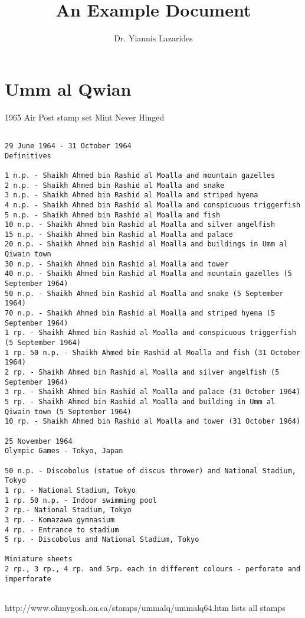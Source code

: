 \documentclass{book}      %
\title{An Example Document}  %
\author{Dr. Yiannis Lazarides}      %
\newcommand{\ph}[3][1]{%
 \begin{figure}[htbp]
   \texttt{[image: \#2]}
   \caption{#3}
 \end{figure}}
\begin{document}

\maketitle                   %




\section{Umm al Qwian}  


 
1965 Air Post stamp set Mint Never Hinged

\begin{verbatim}

29 June 1964 - 31 October 1964
Definitives

1 n.p. - Shaikh Ahmed bin Rashid al Moalla and mountain gazelles
2 n.p. - Shaikh Ahmed bin Rashid al Moalla and snake
3 n.p. - Shaikh Ahmed bin Rashid al Moalla and striped hyena
4 n.p. - Shaikh Ahmed bin Rashid al Moalla and conspicuous triggerfish
5 n.p. - Shaikh Ahmed bin Rashid al Moalla and fish
10 n.p. - Shaikh Ahmed bin Rashid al Moalla and silver angelfish
15 n.p. - Shaikh Ahmed bin Rashid al Moalla and palace
20 n.p. - Shaikh Ahmed bin Rashid al Moalla and buildings in Umm al Qiwain town
30 n.p. - Shaikh Ahmed bin Rashid al Moalla and tower
40 n.p. - Shaikh Ahmed bin Rashid al Moalla and mountain gazelles (5 September 1964)
50 n.p. - Shaikh Ahmed bin Rashid al Moalla and snake (5 September 1964)
70 n.p. - Shaikh Ahmed bin Rashid al Moalla and striped hyena (5 September 1964)
1 rp. - Shaikh Ahmed bin Rashid al Moalla and conspicuous triggerfish (5 September 1964)
1 rp. 50 n.p. - Shaikh Ahmed bin Rashid al Moalla and fish (31 October 1964)
2 rp. - Shaikh Ahmed bin Rashid al Moalla and silver angelfish (5 September 1964)
3 rp. - Shaikh Ahmed bin Rashid al Moalla and palace (31 October 1964)
5 rp. - Shaikh Ahmed bin Rashid al Moalla and building in Umm al Qiwain town (5 September 1964)
10 rp. - Shaikh Ahmed bin Rashid al Moalla and tower (31 October 1964)

25 November 1964
Olympic Games - Tokyo, Japan

50 n.p. - Discobolus (statue of discus thrower) and National Stadium, Tokyo
1 rp. - National Stadium, Tokyo
1 rp. 50 n.p. - Indoor swimming pool
2 rp.- National Stadium, Tokyo
3 rp. - Komazawa gymnasium
4 rp. - Entrance to stadium
5 rp. - Discobolus and National Stadium, Tokyo

Miniature sheets
2 rp., 3 rp., 4 rp. and 5rp. each in different colours - perforate and imperforate
 
\end{verbatim}


http://www.ohmygosh.on.ca/stamps/ummalq/ummalq64.htm lists all stamps
                         
\end{document}
